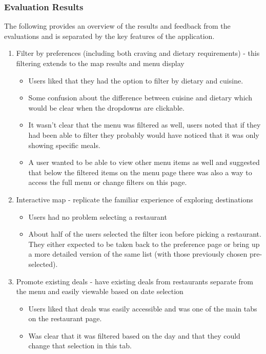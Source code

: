 \documentclass[a4 paper, 12pt]{article}
\begin{document}
\subsubsection{Evaluation Results}
The following provides an overview of the results and feedback from the evaluations and is separated by the key features of the application.

\begin{enumerate}
    \item Filter by preferences (including both craving and dietary requirements) - this filtering extends to the map results and menu display
        \begin{itemize}
            \item Users liked that they had the option to filter by dietary and cuisine. 
            \item Some confusion about the difference between cuisine and dietary which would be clear when the dropdowns are clickable.
            \item It wasn't clear that the menu was filtered as well, users noted that if they had been able to filter they probably would have noticed that it was only showing specific meals.
            \item A user wanted to be able to view other menu items as well and suggested that below the filtered items on the menu page there was also a way to access the full menu or change filters on this page. 
        \end{itemize}

    \item Interactive map - replicate the familiar experience of exploring destinations
        \begin{itemize}
            \item Users had no problem selecting a restaurant
            \item About half of the users selected the filter icon before picking a restaurant. They either expected to be taken back to the preference page or bring up a more detailed version of the same list (with those previously chosen pre-selected). 
        \end{itemize}

    \item Promote existing deals - have existing deals from restaurants separate from the menu and easily viewable based on date selection
        \begin{itemize}
            \item Users liked that deals was easily accessible and was one of the main tabs on the restaurant page. 
            \item Was clear that it was filtered based on the day and that they could change that selection in this tab.
        \end{itemize}


\end{enumerate}
\end{document}
